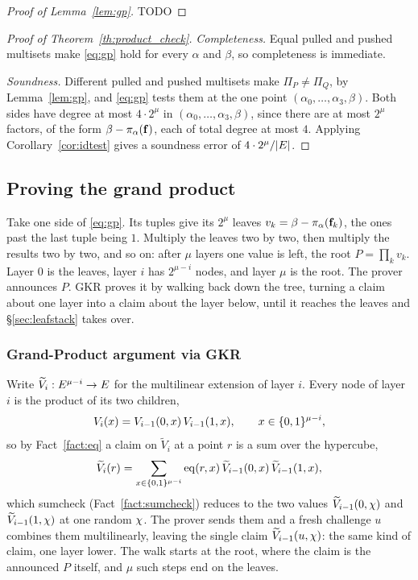 \begin{proof}[Proof of Lemma~\ref{lem:gp}]
TODO
\end{proof}


\begin{proof}[Proof of Theorem~\ref{th:product_check}]
\emph{Completeness.} Equal pulled and pushed multisets make \eqref{eq:gp} hold for every $\alpha$ and $\beta$, so completeness is immediate.

\emph{Soundness.} Different pulled and pushed multisets make $\Pi_P\neq\Pi_Q$, by Lemma~\ref{lem:gp}, and \eqref{eq:gp} tests them at the one point $(\alpha_0, \dots, \alpha_3, \beta)$. Both sides have degree at most $4\cdot 2^{\mu}$ in $(\alpha_0, \dots, \alpha_3, \beta)$, since there are at most $2^{\mu}$ factors, of the form $\beta-\pi_\alpha(\mathbf{f})$, each of total degree at most $4$. Applying Corollary~\ref{cor:idtest} gives a soundness error of $4\cdot 2^{\mu}/|E|$.
\end{proof}

\subsection{Proving the grand product}\label{sec:gkr}

Take one side of \eqref{eq:gp}. Its tuples give its $2^{\mu}$ leaves $v_k=\beta-\pi_\alpha(\mathbf{f}_k)$, the ones past the last tuple being $1$. Multiply the leaves two by two, then multiply the results two by two, and so on: after $\mu$ layers one value is left, the root $P=\prod_kv_k$. Layer $0$ is the leaves, layer $i$ has $2^{\mu-i}$ nodes, and layer $\mu$ is the root. The prover announces $P$. GKR proves it by walking back down the tree, turning a claim about one layer into a claim about the layer below, until it reaches the leaves and \S\ref{sec:leafstack} takes over.

\subsubsection{Grand-Product argument via GKR}

Write $\widetilde V_i:E^{\mu-i}\to E$ for the multilinear extension of layer $i$. Every node of layer $i$ is the product of its two children,
\[
V_i(x)=V_{i-1}(0,x)\,V_{i-1}(1,x),\qquad x\in\{0,1\}^{\mu-i},
\]
so by Fact~\ref{fact:eq} a claim on $\widetilde V_i$ at a point $r$ is a sum over the hypercube,
\[
\widetilde V_i(r)=\sum_{x\in\{0,1\}^{\mu-i}}\operatorname{eq}(r,x)\,\widetilde V_{i-1}(0,x)\,\widetilde V_{i-1}(1,x),
\]
which sumcheck (Fact~\ref{fact:sumcheck}) reduces to the two values $\widetilde V_{i-1}(0,\chi)$ and $\widetilde V_{i-1}(1,\chi)$ at one random $\chi$. The prover sends them and a fresh challenge $u$ combines them multilinearly, leaving the single claim $\widetilde V_{i-1}(u,\chi)$: the same kind of claim, one layer lower. The walk starts at the root, where the claim is the announced $P$ itself, and $\mu$ such steps end on the leaves.

